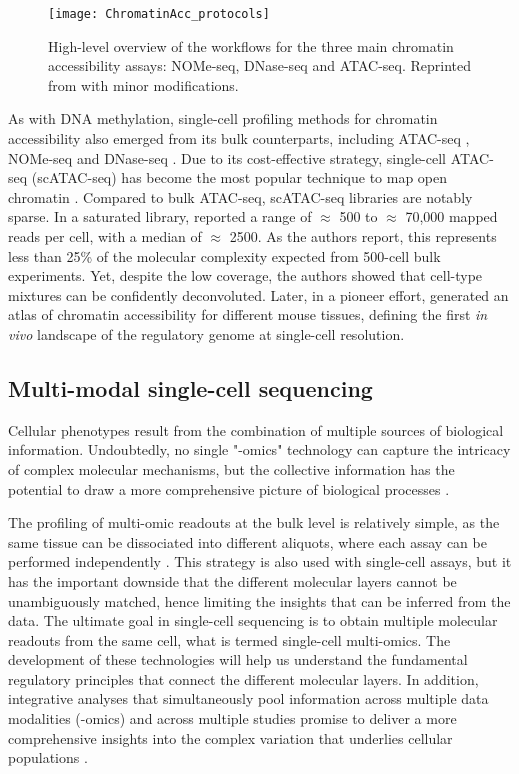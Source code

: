 \begin{figure}[H]
	\centering
	\texttt{[image: ChromatinAcc\_protocols]}
	\caption[]{High-level overview of the workflows for the three main chromatin accessibility assays: NOMe-seq, DNase-seq and ATAC-seq. Reprinted from \cite{Nordstrom2019} with minor modifications.}
	\label{fig:ChromatinAcc_protocols}
\end{figure}

As with DNA methylation, single-cell profiling methods for chromatin accessibility also emerged from its bulk counterparts, including ATAC-seq \cite{Buenrostro2015a}, NOMe-seq \cite{Pott2016} and DNase-seq \cite{Jin2015}. Due to its cost-effective strategy, single-cell ATAC-seq (scATAC-seq) has become the most popular technique to map open chromatin \cite{Cusanovich2015,Cao2018,Chen2018}. Compared to bulk ATAC-seq, scATAC-seq libraries are notably sparse. In a saturated library, \cite{Cusanovich2015} reported a range of $\approx$ 500 to $\approx$ 70,000 mapped reads per cell, with a median of $\approx$ 2500. As the authors report, this represents less than 25\% of the molecular complexity expected from 500-cell bulk experiments. Yet, despite the low coverage, the authors showed that cell-type mixtures can be confidently deconvoluted. Later, in a pioneer effort, \cite{Cusanovich2018b} generated an atlas of chromatin accessibility for different mouse tissues, defining the first \textit{in vivo} landscape of the regulatory genome at single-cell resolution.

\subsection{Multi-modal single-cell sequencing} \label{section:single_cell_multi_modal}

Cellular phenotypes result from the combination of multiple sources of biological information. Undoubtedly, no single "-omics" technology can capture the intricacy of complex molecular mechanisms, but the collective information has the potential to draw a more comprehensive picture of biological processes \cite{Hasin2017,Ritchie2015}.

The profiling of multi-omic readouts at the bulk level is relatively simple, as the same tissue can be dissociated into different aliquots, where each assay can be performed independently \cite{Ritchie2015}. This strategy is also used with single-cell assays, but it has the important downside that the different molecular layers cannot be unambiguously matched, hence limiting the insights that can be inferred from the data. The ultimate goal in single-cell sequencing is to obtain multiple molecular readouts from the same cell, what is termed single-cell multi-omics. The development of these technologies will help us understand the fundamental regulatory principles that connect the different molecular layers. In addition, integrative analyses that simultaneously pool information across multiple data modalities (-omics) and across multiple studies promise to deliver a more comprehensive insights into the complex variation that underlies cellular populations .

